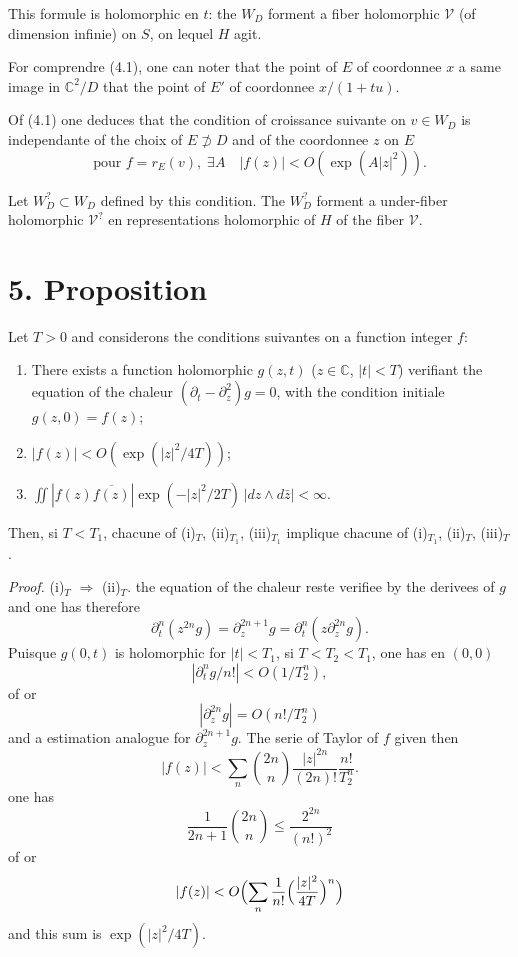 \documentclass[12pt,a4paper]{article}
\theoremstyle{plain}
\theoremstyle{definition}
\theoremstyle{remark}
\begin{document}
This formule is holomorphic en $t$: the $W_D$ forment a fiber holomorphic $\mathscr{V}$ (of dimension infinie) on $S$, on lequel $H$ agit.

For comprendre (4.1), one can noter that the point of $E$ of coordonnee $x$ a same image in $\mathbb{C}^2/D$ that the point of $E'$ of coordonnee $x/(1 + tu)$.

Of (4.1) one deduces that the condition of croissance suivante on $v \in W_D$ is independante of the choix of $E \not\supset D$ and of the coordonnee $z$ on $E$
\begin{equation}\label{eq:4.2}
\text{pour } f = r_E(v), \; \exists A \quad |f(z)| < O(\exp(A|z|^2)).\tag{4.2}
\end{equation}

Let $W_D^? \subset W_D$ defined by this condition. The $W_D^?$ forment a under-fiber holomorphic $\mathscr{V}^?$ en representations holomorphic of $H$ of the fiber $\mathscr{V}$.

\section*{5. Proposition}

Let $T > 0$ and considerons the conditions suivantes on a function integer $f$:

\begin{enumerate}[label=(\roman*)$_T$]
\item There exists a function holomorphic $g(z, t)$ ($z \in \mathbb{C}$, $|t| < T$) verifiant the equation of the chaleur $(\partial_t - \partial_z^2)g = 0$, with the condition initiale $g(z, 0) = f(z)$;
\item $|f(z)| < O(\exp(|z|^2/4T))$;
\item $\displaystyle\iint |f(z)\overline{f(z)}|\exp(-|z|^2/2T)\,|dz \wedge d\bar{z}| < \infty$.
\end{enumerate}

Then, si $T < T_1$, chacune of (i)$_T$, (ii)$_{T_1}$, (iii)$_{T_1}$ implique chacune of (i)$_{T_1}$, (ii)$_T$, (iii)$_T$.

\medskip
\noindent\textit{Proof.} (i)$_T$ $\Rightarrow$ (ii)$_T$. the equation of the chaleur reste verifiee by the derivees of $g$ and one has therefore
\[\partial_t^n(z^{2n}g) = \partial_z^{2n+1}g = \partial_t^n(z\partial_z^{2n}g).\]
Puisque $g(0, t)$ is holomorphic for $|t| < T_1$, si $T < T_2 < T_1$, one has en $(0, 0)$
\[|\partial_t^n g/n!| < O(1/T_2^n),\]
of or
\[|\partial_z^{2n}g| = O(n!/T_2^n)\]
and a estimation analogue for $\partial_z^{2n+1}g$. The serie of Taylor of $f$ given then
\[|f(z)| < \sum_n \binom{2n}{n} \frac{|z|^{2n}}{(2n)!} \frac{n!}{T_2^n}.\]
one has
\[\frac{1}{2n+1}\binom{2n}{n} \leq \frac{2^{2n}}{(n!)^2}\]
of or
\[|f(z)| < O\Bigl(\sum_n \frac{1}{n!}\Bigl(\frac{|z|^2}{4T}\Bigr)^n\Bigr)\]
and this sum is $\exp(|z|^2/4T)$.
\end{document}
